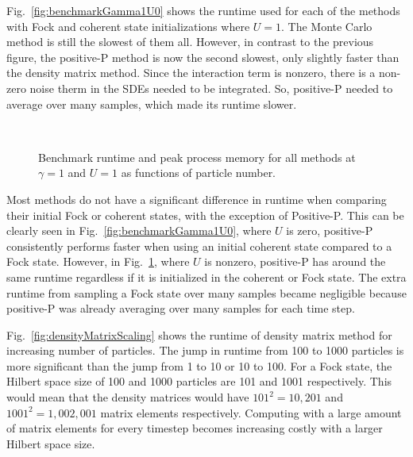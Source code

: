 \hspace{\parindent} Fig.~\ref{fig:benchmarkGamma1U0} shows the runtime used for each of the methods with Fock and coherent state initializations where $U=1$. The Monte Carlo method is still the slowest of them all. However, in contrast to the previous figure, the positive-P method is now the second slowest, only slightly faster than the density matrix method. Since the interaction term is nonzero, there is a non-zero noise therm in the SDEs needed to be integrated. So, positive-P needed to average over many samples, which made its runtime slower.

\begin{figure}[h]
  \centering
  \\
  \caption{
  Benchmark runtime and peak process memory for all methods at $\gamma=1$ and $U=1$ as functions of particle number.
  }
  \label{fig:benchmarkGamma1U1}
\end{figure}

\hspace{\parindent}Most methods do not have a significant difference in runtime when comparing their initial Fock or coherent states, with the exception of Positive-P. This can be clearly seen in Fig.~\ref{fig:benchmarkGamma1U0}, where $U$ is zero, positive-P consistently performs faster when using an initial coherent state compared to a Fock state. However, in Fig.~\ref{fig:benchmarkGamma1U1}, where $U$ is nonzero, positive-P has around the same runtime regardless if it is initialized in the coherent or Fock state. The extra runtime from sampling a Fock state over many samples became negligible because positive-P was already averaging over many samples for each time step. 

\hspace{\parindent} Fig.~\ref{fig:densityMatrixScaling} shows the runtime of density matrix method for increasing number of particles. The jump in runtime from 100 to 1000 particles is more significant than the jump from 1 to 10 or 10 to 100. For a Fock state, the Hilbert space size of 100 and 1000 particles are 101 and 1001 respectively. This would mean that the density matrices would have $101^2=10,201$ and $1001^2 = 1,002,001$ matrix elements respectively. Computing with a large amount of matrix elements for every timestep becomes increasing costly with a larger Hilbert space size.

